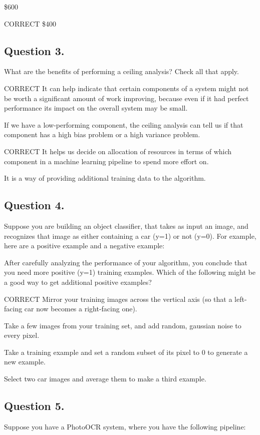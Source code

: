 \documentclass[11pt]{article} %
\begin{document}
\$600

CORRECT \$400

\subsection*{Question  3. }
What are the benefits of performing a ceiling analysis? Check all that apply.

CORRECT It can help indicate that certain components of a system might not be worth a significant amount of work improving, because even if it had perfect performance its impact on the overall system may be small.

If we have a low-performing component, the ceiling analysis can tell us if that component has a high bias problem or a high variance problem.

CORRECT It helps us decide on allocation of resources in terms of which component in a machine learning pipeline to spend more effort on.

It is a way of providing additional training data to the algorithm.

\subsection*{Question  4. }
Suppose you are building an object classifier, that takes as input an image, and recognizes that image as either containing a car (y=1) or not (y=0). For example, here are a positive example and a negative example:


After carefully analyzing the performance of your algorithm, you conclude that you need more positive (y=1) training examples. Which of the following might be a good way to get additional positive examples?


CORRECT Mirror your training images across the vertical axis (so that a left-facing car now becomes a right-facing one).

Take a few images from your training set, and add random, gaussian noise to every pixel.

Take a training example and set a random subset of its pixel to 0 to generate a new example.

Select two car images and average them to make a third example.

\subsection*{Question  5. }
Suppose you have a PhotoOCR system, where you have the following pipeline:
\end{document}
